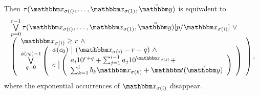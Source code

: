 {Then $\tau(\ivarx_{\sigma(i)}, \ldots, \ivarx_{\sigma(1)}, \vec{\ivary})$ is equivalent to 
\[
\begin{array}{l}
\bigvee \limits_{p=0}^{r-1} \tau(\ivarx_{\sigma(i)}, \ldots, \ivarx_{\sigma(1)}, \vec{\ivary})[p/\ivarx_{\sigma(i)}]\ \vee \\
\left(
\begin{array}{l}
\ivarx_{\sigma(i)} \ge r\ \wedge \\
\bigvee \limits_{q = 0}^{\phi(c_0)-1} 
\left(
\begin{array}{l}
\phi(c_0)\ \big |\ (\ivarx_{\sigma(i)} - r - q)\ \wedge \\
c\ \big | 
\left(
\begin{array}{l}
a_i 10^{r+q} + \sum_{j=1}^{i-1} a_j 10^{\ivarx_{\sigma(j)}} + \\
\sum_{k=1}^{i} b_k \ivarx_{\sigma(k)} + \iterm(\vec{\ivary})
\end{array}
\right) 
\end{array}
\right)
\end{array}
\right),
\end{array}
\]
where the exponential occurrences of $\ivarx_{\sigma(i)}$ disappear.
}


